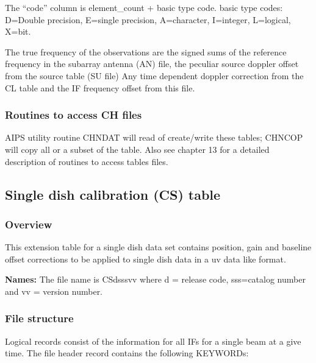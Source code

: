   The ``code'' column is element\_count + basic type code.
basic type codes: D=Double precision, E=single precision, A=character,
I=integer, L=logical, X=bit.

     The true frequency of the observations are the signed sums of the
reference frequency in the subarray antenna (AN) file, the peculiar
source doppler offset from the source table (SU file) Any time
dependent doppler correction from the CL table and the IF frequency
offset from this file.

\subsubsection{Routines to access CH files}
     AIPS utility routine CHNDAT will read of
create/write these tables; CHNCOP will copy all or a
subset of the table.  Also see chapter 13 for a detailed description
of routines to access tables files.

\subsection{Single dish calibration (CS) table}
\subsubsection{Overview}
 
   This extension table for a single dish data set contains position,
gain and baseline offset corrections to be applied to single dish data
in a uv data like format.
 
{\bf Names:} The file name is CSdsssvv where d = release code,
sss=catalog number and vv = version number.
 
\subsubsection{File structure}

     Logical records consist of the information for all IFs
for a single beam at a give time.  The file header record contains the
following KEYWORDs:


